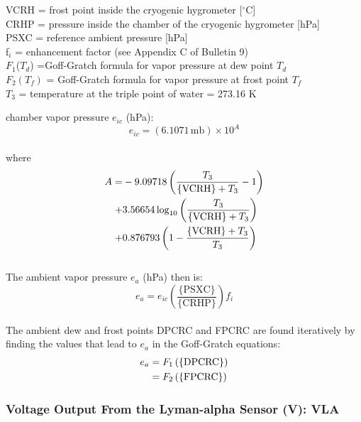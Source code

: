 \documentclass[
  english,
]{book}
\begin{document}
VCRH = frost point inside the cryogenic hygrometer {[}\(^{\circ}\)C{]}\\
CRHP = pressure inside the chamber of the cryogenic hygrometer {[}hPa{]}\\
PSXC = reference ambient pressure {[}hPa{]}\\
f\(_{i}\) = enhancement factor (see Appendix C of Bulletin 9)\\
\(F_{1}\)(\(T_{d}\)) =Goff-Gratch formula for vapor pressure at dew
point \(T_{d}\)\\
\(F_{2}(T_{f})\) = Goff-Gratch formula for vapor pressure at frost
point \(T_{f}\)\\
\(T_{3}\) = temperature at the triple point of water = 273.16 K

chamber vapor pressure \(e_{ic}\) (hPa):\\
\begin{equation}
e_{ic}=(6.1071\,\mathrm{mb})\times10^{A}  
\label{eq:DPCRCbox1}
\end{equation}\\
where
\begin{align}  
A=&-9.09718\left(\frac{T_{3}}{\mathrm{\{VCRH\}}+T_{3}}-1\right) \notag \\
+ & 3.56654\log_{10}\left(\frac{T_{3}}{\mathrm{\{VCRH\}}+T_{3}}\right) \notag \\
+ & 0.876793\left(1-\frac{\mathrm{\{VCRH\}}+T_{3}}{T_{3}}\right)
\label{eq:DPCRCbox2}
\end{align}\\
The ambient vapor pressure \(e_{a}\) (hPa) then is:\\
\begin{equation}
e_{a}=e_{ic}\left(\frac{\mathrm{\{PSXC\}}}{\mathrm{\{CRHP\}}}\right)f_{i}
\label{eq:DPCRCbox3}
\end{equation}\\
The ambient dew and frost points DPCRC and FPCRC are found iteratively by finding
the values that lead to \(e_a\) in the Goff-Gratch equations:\\
\begin{align}
e_{a} & = F_{1}\left(\mathrm{\{DPCRC\}}\right)\notag \\
 & = F_{2}\left(\mathrm{\{FPCRC\}}\right)
\label{eq:DPXRXbox4}
\end{align}

\hypertarget{vla}{%
\subsubsection*{Voltage Output From the Lyman-alpha Sensor (V): VLA}\label{vla}}
\end{document}
